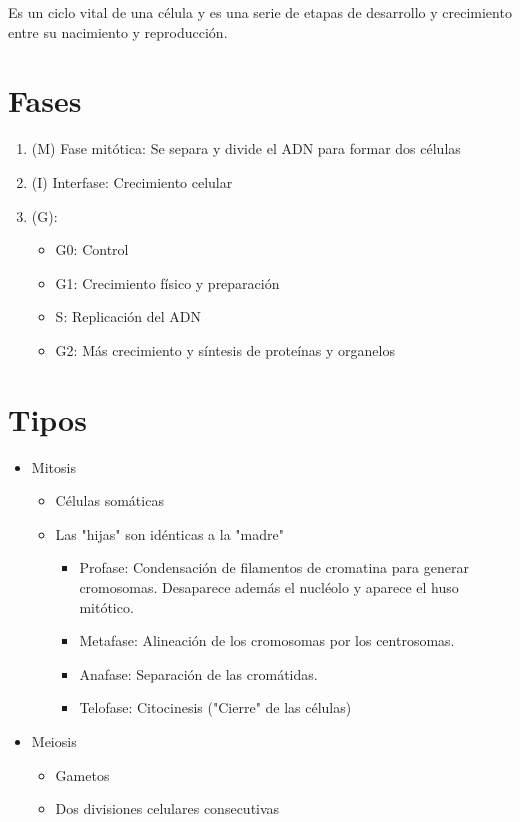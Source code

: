 
Es un ciclo vital de una célula y es una serie de etapas de desarrollo y crecimiento entre su nacimiento y reproducción.

\section{Fases}

\begin{enumerate}
    \item (M) Fase mitótica: Se separa y divide el ADN para formar dos células
    \item (I) Interfase: Crecimiento celular
    \item (G):
        \begin{itemize}
            \item G0: Control
            \item G1: Crecimiento físico y preparación
            \item S: Replicación del ADN
            \item G2: Más crecimiento y síntesis de proteínas y organelos
        \end{itemize}
\end{enumerate}

\section{Tipos}

\begin{itemize}
    \item Mitosis
        \begin{itemize}
            \item Células somáticas
	        \item Las "hijas" son idénticas a la "madre"
	            \begin{itemize}
	                \item Profase: Condensación de filamentos de cromatina para generar cromosomas. Desaparece además el nucléolo y aparece el huso mitótico.
		            \item Metafase: Alineación de los cromosomas por los centrosomas.
		            \item Anafase: Separación de las cromátidas.
		            \item Telofase: Citocinesis ("Cierre" de las células)
	            \end{itemize}
        \end{itemize}
    \item Meiosis
        \begin{itemize}
            \item Gametos
	        \item Dos divisiones celulares consecutivas
        \end{itemize}
\end{itemize}